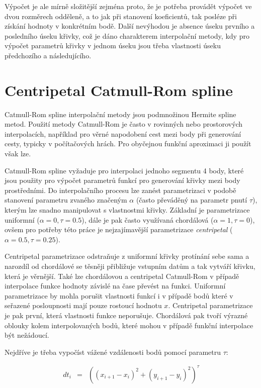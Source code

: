 \documentclass[]{thesiskiv}
\begin{document}
Výpočet je ale mírně složitější zejména proto, že je potřeba provádět výpočet ve dvou rozměrech odděleně, a to jak při stanovení koeficientů, tak posléze při získání hodnoty v konkrétním bodě. Další nevýhodou je absence úseku prvního a posledního úseku křivky, což je dáno charakterem interpolační metody, kdy pro výpočet parametrů křivky v jednom úseku jsou třeba vlastnosti úseku předchozího a následujícího.

\section{Centripetal Catmull-Rom spline}

Catmull-Rom spline interpolační metody jsou podmnožinou Hermite spline metod. Použití metody Catmull-Rom je často v rovinných nebo prostorových interpolacích, například pro věrné napodobení cest mezi body při generování cesty, typicky v počítačových hrách. Pro obyčejnou funkční aproximaci ji použít však lze.

Catmull-Rom spline vyžaduje pro interpolaci jednoho segmentu 4 body, které jsou použity pro výpočet parametrů funkcí pro generování křivky mezi body prostředními. Do interpolačního procesu lze zanést parametrizaci v podobě stanovení parametru zvaného  značeným $\alpha$ (často převáděný na parametr pnutí $\tau$), kterým lze snadno manipulovat s vlastnostmi křivky. Základní je parametrizace uniformní ($\alpha = 0, \tau = 0.5$), dále je pak často využívaná chordálová ($\alpha = 1, \tau = 0$), ovšem pro potřeby této práce je nejzajímavější parametrizace \emph{centripetal} ($\alpha = 0.5, \tau = 0.25$).

Centripetal parametrizace odstraňuje z uniformní křivky protínání sebe sama a narozdíl od chordálové se těsněji přibližuje vstupním datům a tak vytváří křivku, která je věrnější. Také lze chordálovou a centripetal Catmull-Rom v případě interpolace funkce hodnoty závislé na čase převést na funkci. Uniformní parametrizace by mohla porušit vlastnosti funkcí i v případě bodů které v seřazené posloupnosti mají pouze rostoucí hodnotu $x$. Centripetal parametrizace je pak první, která vlastnosti funkce neporušuje. Chordálová pak tvoří výrazné oblouky kolem interpolovaných bodů, které mohou v případě funkční interpolace být nežádoucí.

Nejdříve je třeba vypočíst vážené vzdálenosti bodů pomocí parametru $\tau$:

\begin{equation}
\begin{array}{rcl}
 dt_{i} & = & ((x_{i+1} - x_i)^2 + (y_{i+1} - y_i)^2)^\tau \\
\end{array}
\end{equation}
\end{document}
